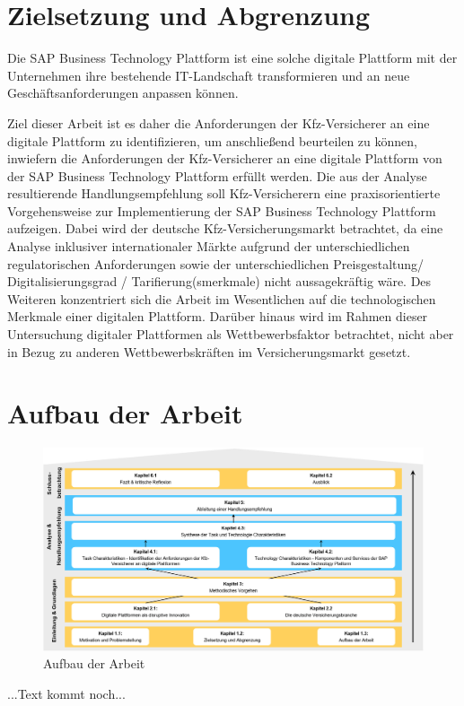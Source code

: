 \section{Zielsetzung und Abgrenzung}

Die SAP Business Technology Plattform ist eine solche digitale Plattform mit der Unternehmen ihre bestehende IT-Landschaft transformieren und an neue Geschäftsanforderungen anpassen können. 

Ziel dieser Arbeit ist es daher die Anforderungen der Kfz-Versicherer an eine digitale Plattform zu identifizieren, um anschließend beurteilen zu können, inwiefern die Anforderungen der Kfz-Versicherer an eine digitale Plattform von der SAP Business Technology Plattform erfüllt werden. Die aus der Analyse resultierende Handlungsempfehlung soll Kfz-Versicherern eine praxisorientierte Vorgehensweise zur Implementierung der SAP Business Technology Plattform aufzeigen.
Dabei wird der deutsche Kfz-Versicherungsmarkt betrachtet, da eine Analyse inklusiver internationaler Märkte aufgrund der unterschiedlichen regulatorischen Anforderungen sowie der unterschiedlichen Preisgestaltung/ Digitalisierungsgrad / Tarifierung(smerkmale)  nicht aussagekräftig wäre. Des Weiteren konzentriert sich die Arbeit im Wesentlichen auf die technologischen Merkmale einer digitalen Plattform. Darüber hinaus wird im Rahmen dieser Untersuchung digitaler Plattformen als Wettbewerbsfaktor betrachtet, nicht aber in Bezug zu anderen Wettbewerbskräften im Versicherungsmarkt gesetzt.

\newpage
\section{Aufbau der Arbeit}

\begin{figure}[h]
    \centering
    \includegraphics[width=1\textwidth]{img/Aufbau_der_Arbeit.jpg}
    \caption[Aufbau der Arbeit]{Aufbau der Arbeit\autocite{Aufbau}}
    \label{fig:Aufbau}
\end{figure}


...Text kommt noch...

\newpage